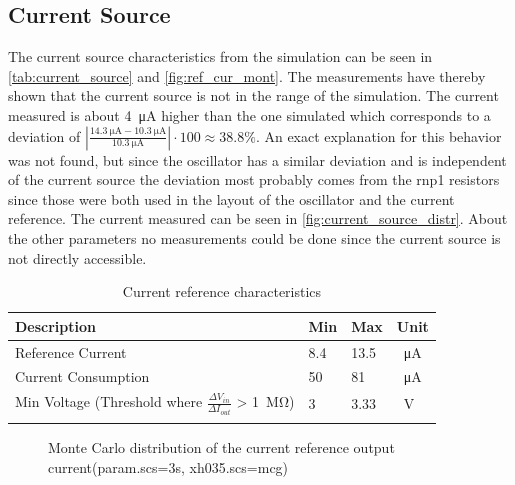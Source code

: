 \subsection{Current Source}
\label{subsubsec:current_source}
The current source characteristics from the simulation can be seen in \autoref{tab:current_source} and \autoref{fig:ref_cur_mont}. The measurements have thereby shown that the current source is not in the range of the simulation. The current measured is about \qty{4}{\micro\ampere} higher than the one simulated which corresponds to a deviation of $\left|\frac{\qty{14.3}{\micro\ampere}-\qty{10.3}{\micro\ampere}}{\qty{10.3}{\micro\ampere}}\right|\cdot 100\approx 38.8 \%$. An exact explanation for this behavior was not found, but since the oscillator has a similar deviation and is independent of the current source the deviation most probably comes from the \glqq rnp1\grqq{} resistors since those were both used in the layout of the oscillator and the current reference.
The current measured can be seen in \autoref{fig:current_source_distr}. About the other parameters no measurements could be done since the current source is not directly accessible.
\begin{longtable}{|p{5cm}|p{2.5cm}|p{2.5cm}|p{2.5cm}|}
	\hline
	\rowcolor{lightgray}
	\textbf{Description} &\textbf{Min} &\textbf{Max} & \textbf{Unit} \\ \hline
	
	Reference Current & 8.4 & 13.5 &\qty{}{\micro\ampere} \\ \hline
	Current Consumption & 50 & 81 & \qty{}{\micro\ampere} \\ \hline
	Min Voltage (Threshold where $\frac{\Delta V_{in}}{\Delta I_{out}}$ > \qty{1}{\mega\ohm}) & 3& 3.33 & \qty{}{\volt} \\ \hline
	\caption{Current reference characteristics} %
	\label{tab:current_source}
\end{longtable}
\begin{figure}[ht]
	\centering
	\caption{Monte Carlo distribution of the current reference output current(param.scs=3s, xh035.scs=mcg)}
	\label{fig:ref_cur_mont}
\end{figure}
